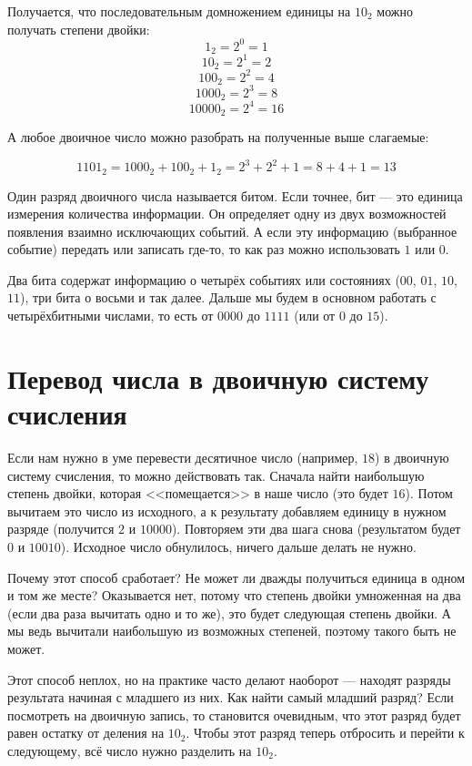 Получается, что последовательным домножением единицы на $10_2$ можно получать степени двойки:
$$1_2=2^0=1$$
$$10_2=2^1=2$$
$$100_2=2^2=4$$
$$1000_2=2^3=8$$
$$10000_2=2^4=16$$

А любое двоичное число можно разобрать на полученные выше слагаемые:

$$1101_2=1000_2+100_2+1_2=2^3+2^2+1=8+4+1=13$$

Один разряд двоичного числа называется битом. Если точнее, бит --- это единица
измерения количества информации. Он определяет одну из двух возможностей
появления взаимно исключающих событий. А если эту информацию
(выбранное событие) передать или записать где-то, то как раз можно использовать $1$ или $0$.

Два бита содержат информацию о четырёх событиях или состояниях ($00$, $01$, $10$, $11$),
три бита о восьми и так далее. Дальше мы будем в основном работать с четырёхбитными
числами, то есть от $0000$ до $1111$ (или от $0$ до $15$).


\section{Перевод числа в двоичную систему счисления}

Если нам нужно в уме перевести десятичное число (например, $18$) в двоичную систему счисления,
то можно действовать так.
Сначала найти наибольшую степень двойки, которая <<помещается>> в наше число (это будет $16$).
Потом вычитаем это число из исходного, а к результату добавляем единицу в нужном разряде
(получится $2$ и $10000$).
Повторяем эти два шага снова (результатом будет $0$ и $10010$). Исходное число обнулилось,
ничего дальше делать не нужно.

Почему этот способ сработает? Не может ли дважды получиться единица в одном и том же месте?
Оказывается нет, потому что степень двойки умноженная на два (если два раза вычитать одно и то же),
это будет следующая степень двойки. А мы ведь вычитали наибольшую из возможных степеней, поэтому
такого быть не может.

Этот способ неплох, но на практике часто делают наоборот --- находят разряды результата начиная
с младшего из них. Как найти самый младший разряд? Если посмотреть на двоичную запись,
то становится очевидным, что этот разряд будет равен остатку от деления на $10_2$.
Чтобы этот разряд теперь отбросить и перейти к следующему, всё число нужно разделить на $10_2$.


